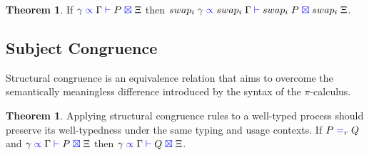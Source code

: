 \documentclass[a4paper,UKenglish,cleveref, autoref, thm-restate,authorcolumns]{lipics-v2019}
\theoremstyle{definition}
\newtheorem{nitheorem}[theorem]{Theorem}
\newcommand{\picalc}{$\pi$-calculus}
\newcommand{\type}[1]{\textcolor{blue}{\operatorname{#1}}}
\newcommand{\types}[4]{#1 \; \type{\propto} \; #2 \; \type{\vdash} \; #3 \; \type{\boxtimes} \; #4}
\newcommand{\eq}[1]{\; \type{=}_{#1} \;}
\begin{document}
\begin{nitheorem}
  \label{thm:swapping}
  If $\types{\gamma}{\Gamma}{P}{\Xi}$ then $\types{swap_i \; \gamma}{swap_i \; \Gamma}{swap_i \; P}{swap_i \; \Xi}$.
\end{nitheorem}

\todo{}

\subsection{Subject Congruence}
\label{subject-congruence}

Structural congruence is an equivalence relation that aims to overcome the semantically meaningless difference introduced by the syntax of the \picalc{}.

\begin{nitheorem}
  \label{thm:subject-congruence}
  Applying structural congruence rules to a well-typed process should preserve its well-typedness under the same typing and usage contexts.
  If $P \eq{r} Q$ and $\types{\gamma}{\Gamma}{P}{\Xi}$ then $\types{\gamma}{\Gamma}{Q}{\Xi}$.
\end{nitheorem}
\end{document}
